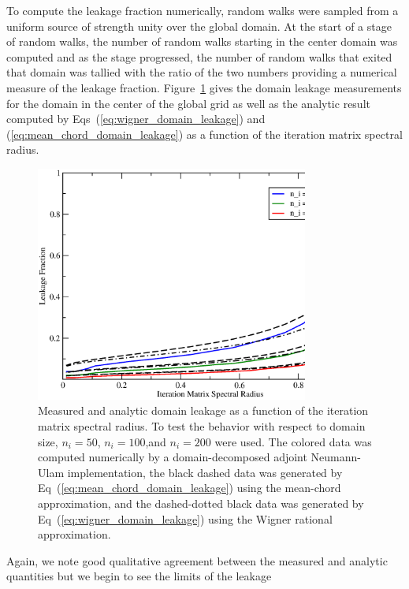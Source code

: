 \documentclass[preprint,11pt]{elsarticle}
\begin{document}
To compute the leakage fraction numerically,  random walks were
sampled from a uniform source of strength unity over the global domain. At the
start of a stage of random walks, the number of random walks starting in the
center domain was computed and as the stage progressed, the number of random
walks that exited that domain was tallied with the ratio of the two numbers
providing a numerical measure of the leakage
fraction. Figure~\ref{fig:measured_leakage} gives the domain leakage
measurements for the domain in the center of the global grid as well as the
analytic result computed by Eqs~(\ref{eq:wigner_domain_leakage}) and
(\ref{eq:mean_chord_domain_leakage}) as a function of the iteration matrix
spectral radius.
\begin{figure}[ht!]
  \begin{center}
    \includegraphics[width=0.8\textwidth]{leakage_fraction.eps}
  \end{center}
  \caption{Measured and analytic domain leakage as a function of the iteration
    matrix spectral radius. To test the behavior with respect to domain size,
    $n_i=50$, $n_i=100$,and $n_i=200$ were used. The colored data was computed
    numerically by a domain-decomposed adjoint Neumann-Ulam implementation,
    the black dashed data was generated by
    Eq~(\ref{eq:mean_chord_domain_leakage}) using the mean-chord
    approximation, and the dashed-dotted black data was generated by
    Eq~(\ref{eq:wigner_domain_leakage}) using the Wigner rational
    approximation.}
  \label{fig:measured_leakage}
\end{figure}
Again, we note good qualitative agreement between the measured and
analytic quantities but we begin to see the limits of the leakage
\end{document}
